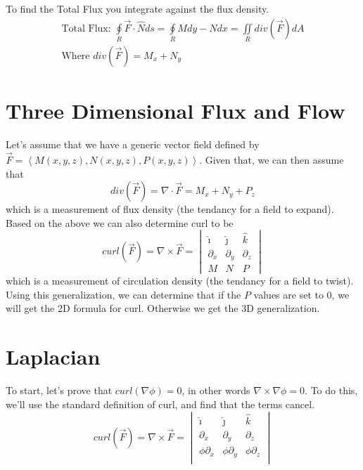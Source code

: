 \documentclass{article}
\newcommand{\nvec}[1]{\left\langle #1 \right\rangle}
\begin{document}
To find the Total Flux you integrate against the flux density.\\

\begin{equation}
\begin{aligned}
\text{Total Flux: } \oint\limits_R \vec{F} \cdot \hat{N} ds = \oint\limits_R Mdy - Ndx = \iint\limits_R div(\vec{F})dA \\
\text{Where } div(\vec{F})=M_x + N_y
\end{aligned}
\end{equation}

\section{Three Dimensional Flux and Flow}

Let's assume that we have a generic vector field defined by $\vec{F} = \nvec{M(x,y,z), N(x,y,z), P(x,y,z)}$. Given that, we can then assume that
\begin{equation}
div(\vec{F})=\nabla \cdot \vec{F} = M_x + N_y + P_z
\end{equation}
which is a measurement of flux density (the tendancy for a field to expand).\\

Based on the above we can also determine curl to be
\begin{equation}
curl(\vec{F}) = \nabla \times \vec{F} =
    \begin{vmatrix}
    \hat{\imath} & \hat{\jmath} & \hat{k} \\
    \partial_x & \partial_y & \partial_z\\
    M & N & P
    \end{vmatrix}
\end{equation}
which is a measurement of circulation density (the tendancy for a field to twist).\\

Using this generalization, we can determine that if the $P$ values are set to 0, we will get the 2D formula for curl. Otherwise we get the 3D generalization.

\section{Laplacian}

To start, let's prove that $curl(\nabla \phi) = 0$, in other words $\nabla \times \nabla\phi = 0$. To do this, we'll use the standard definition of curl, and find that the terms cancel.
\[
curl(\vec{F}) = \nabla \times \vec{F} =
    \begin{vmatrix}
    \hat{\imath} & \hat{\jmath} & \hat{k} \\
    \partial_x & \partial_y & \partial_z\\
    \phi\partial_x & \phi\partial_y & \phi\partial_z\\
    \end{vmatrix}
\]
\end{document}
